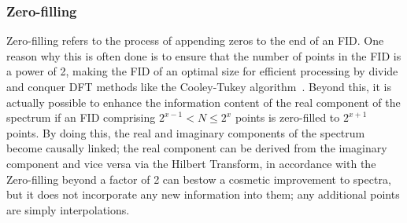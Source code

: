 \subsubsection{Zero-filling}
Zero-filling refers to the process of appending zeros to the end of an
\ac{FID}. One reason why this is often done is to ensure that the number of
points in the \ac{FID} is a power of 2, making the \ac{FID} of an optimal size
for efficient processing by divide and conquer \ac{DFT} methods like the
Cooley-Tukey algorithm~\cite{Cooley1965}. Beyond this, it is actually
possible to enhance the information content of the real component of the
spectrum if an \ac{FID} comprising $2^{x-1} < N \leq 2^x$ points is zero-filled
to $2^{x+1}$ points. By doing this, the real and imaginary
components of
the spectrum become causally linked; the real component can be derived from the
imaginary component and vice versa via the Hilbert Transform, in accordance
with the \label{corr:kram-kron}
Zero-filling beyond a factor of 2 can bestow a
cosmetic improvement to spectra, but it does not incorporate any new
information into them; any additional points are simply interpolations.

